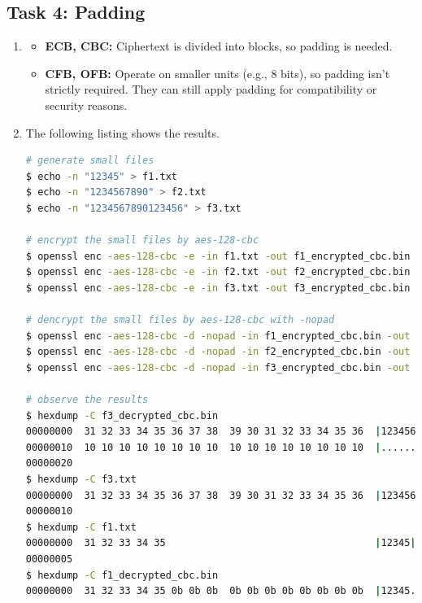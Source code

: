 \documentclass[a4paper]{article}
\begin{document}
\subsection{Task 4: Padding}

\begin{enumerate}
    \item \begin{itemize}
        \item \textbf{ECB, CBC:} Ciphertext is divided into blocks, so padding is needed.
        \item \textbf{CFB, OFB:} Operate on smaller units (e.g., 8 bits), so padding isn't strictly required. They can still apply padding for compatibility or security reasons.
      \end{itemize}
    \item The following listing shows the results.
\begin{lstlisting}[caption={TASK\ 2.4\ Command\ Lines},label={lst:task2.4},language=BASH,breaklines=true]
# generate small files
$ echo -n "12345" > f1.txt
$ echo -n "1234567890" > f2.txt
$ echo -n "1234567890123456" > f3.txt

# encrypt the small files by aes-128-cbc
$ openssl enc -aes-128-cbc -e -in f1.txt -out f1_encrypted_cbc.bin -K 00112233445566778889aabbccddeeff -iv 0102030405060708
$ openssl enc -aes-128-cbc -e -in f2.txt -out f2_encrypted_cbc.bin -K 00112233445566778889aabbccddeeff -iv 0102030405060708
$ openssl enc -aes-128-cbc -e -in f3.txt -out f3_encrypted_cbc.bin -K 00112233445566778889aabbccddeeff -iv 0102030405060708

# dencrypt the small files by aes-128-cbc with -nopad
$ openssl enc -aes-128-cbc -d -nopad -in f1_encrypted_cbc.bin -out f1_decrypted_cbc.bin -K 00112233445566778889aabbccddeeff -iv 0102030405060708
$ openssl enc -aes-128-cbc -d -nopad -in f2_encrypted_cbc.bin -out f2_decrypted_cbc.bin -K 00112233445566778889aabbccddeeff -iv 0102030405060708
$ openssl enc -aes-128-cbc -d -nopad -in f3_encrypted_cbc.bin -out f3_decrypted_cbc.bin -K 00112233445566778889aabbccddeeff -iv 0102030405060708

# observe the results
$ hexdump -C f3_decrypted_cbc.bin
00000000  31 32 33 34 35 36 37 38  39 30 31 32 33 34 35 36  |1234567890123456|
00000010  10 10 10 10 10 10 10 10  10 10 10 10 10 10 10 10  |................|
00000020
$ hexdump -C f3.txt
00000000  31 32 33 34 35 36 37 38  39 30 31 32 33 34 35 36  |1234567890123456|
00000010
$ hexdump -C f1.txt
00000000  31 32 33 34 35                                    |12345|
00000005
$ hexdump -C f1_decrypted_cbc.bin
00000000  31 32 33 34 35 0b 0b 0b  0b 0b 0b 0b 0b 0b 0b 0b  |12345...........|
\end{lstlisting}
\end{enumerate}
\end{document}
